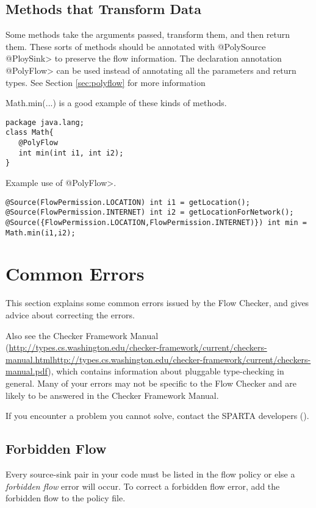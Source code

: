 \subsection{Methods that Transform Data}

Some methods take the arguments passed, transform them, and then return them.  These sorts of 
methods should be annotated with \<@PolySource @PloySink>
  to preserve the flow information.  The declaration annotation \<@PolyFlow> can be used instead of
  annotating all the parameters and return types. See Section \ref{sec:polyflow} for more information 
  
  Math.min(...) is a good example of these kinds of methods. 
  
  \begin{Verbatim}
package java.lang;
class Math{
   @PolyFlow  
   int min(int i1, int i2);
}
\end{Verbatim}

Example use of \<@PolyFlow>.
\begin{Verbatim}
@Source(FlowPermission.LOCATION) int i1 = getLocation();
@Source(FlowPermission.INTERNET) int i2 = getLocationForNetwork();
@Source({FlowPermission.LOCATION,FlowPermission.INTERNET)}) int min = Math.min(i1,i2);
 \end{Verbatim}

\section{Common Errors\label{errors}}

This section explains some common errors issued by the Flow Checker, and
gives advice about correcting the errors.   

Also see the Checker Framework Manual
(\ifhevea\url{http://types.cs.washington.edu/checker-framework/current/checkers-manual.html}\else\url{http://types.cs.washington.edu/checker-framework/current/checkers-manual.pdf}\fi),
which contains information about pluggable type-checking in general.  Many
of your errors may not be specific to the Flow Checker and are likely to be
answered in the Checker Framework Manual.

If you encounter a problem you cannot solve, contact the SPARTA developers ().



\subsection{Forbidden Flow}  
Every source-sink pair in your code must be listed in the flow policy or else a \emph{forbidden flow} error will occur.
To correct a forbidden flow error, add the forbidden flow to the policy file. 
  
